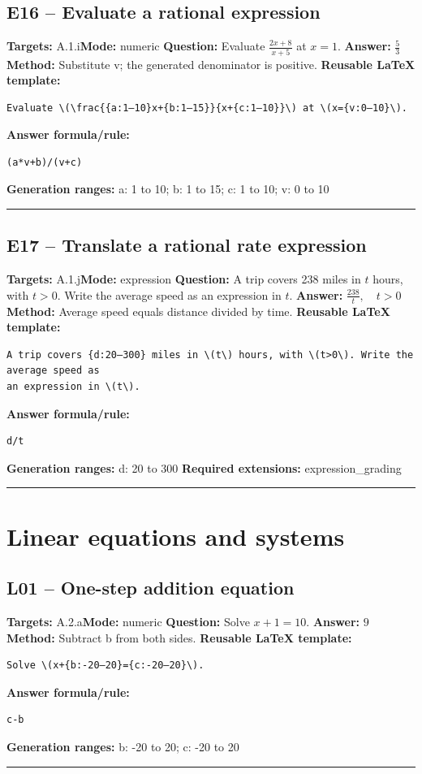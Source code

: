 \documentclass[11pt]{article}
\begin{document}
\subsection{E16 -- Evaluate a rational expression}
\textbf{Targets:} A.1.i\quad\textbf{Mode:} numeric
\textbf{Question:} Evaluate \(\frac{2x+8}{x+5}\) at \(x=1\).
\textbf{Answer:} \(\frac{5}{3}\)
\textbf{Method:} Substitute v; the generated denominator is positive.
\textbf{Reusable LaTeX template:}
\begin{verbatim}
Evaluate \(\frac{{a:1–10}x+{b:1–15}}{x+{c:1–10}}\) at \(x={v:0–10}\).
\end{verbatim}
\textbf{Answer formula/rule:}
\begin{verbatim}
(a*v+b)/(v+c)
\end{verbatim}
\textbf{Generation ranges:} a: 1 to 10; b: 1 to 15; c: 1 to 10; v: 0 to 10
\medskip\hrule\medskip
\subsection{E17 -- Translate a rational rate expression}
\textbf{Targets:} A.1.j\quad\textbf{Mode:} expression
\textbf{Question:} A trip covers 238 miles in \(t\) hours, with \(t>0\). Write the average speed as an expression in \(t\).
\textbf{Answer:} \(\frac{238}{t},\quad t>0\)
\textbf{Method:} Average speed equals distance divided by time.
\textbf{Reusable LaTeX template:}
\begin{verbatim}
A trip covers {d:20–300} miles in \(t\) hours, with \(t>0\). Write the average speed as
an expression in \(t\).
\end{verbatim}
\textbf{Answer formula/rule:}
\begin{verbatim}
d/t
\end{verbatim}
\textbf{Generation ranges:} d: 20 to 300
\textbf{Required extensions:} expression\_grading
\medskip\hrule\medskip
\section{Linear equations and systems}
\subsection{L01 -- One-step addition equation}
\textbf{Targets:} A.2.a\quad\textbf{Mode:} numeric
\textbf{Question:} Solve \(x+1=10\).
\textbf{Answer:} \(9\)
\textbf{Method:} Subtract b from both sides.
\textbf{Reusable LaTeX template:}
\begin{verbatim}
Solve \(x+{b:-20–20}={c:-20–20}\).
\end{verbatim}
\textbf{Answer formula/rule:}
\begin{verbatim}
c-b
\end{verbatim}
\textbf{Generation ranges:} b: -20 to 20; c: -20 to 20
\medskip\hrule\medskip
\end{document}
